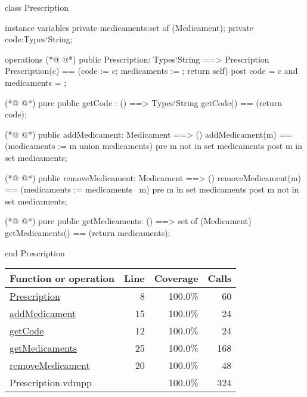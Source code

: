 \begin{vdmpp}[breaklines=true]
class Prescription

instance variables
  private medicaments:set of (Medicament);
  private code:Types`String;
  
operations
(*@
\label{Prescription:8}
@*)
 public Prescription: Types`String ==> Prescription
  Prescription(c) == (code := c; medicaments := {}; return self)
 post code = c and medicaments = {};
 
(*@
\label{getCode:12}
@*)
 pure public getCode : () ==> Types`String
  getCode() == (return code);
  
(*@
\label{addMedicament:15}
@*)
 public addMedicament: Medicament ==> ()
  addMedicament(m) == (medicaments := {m} union medicaments)
 pre m not in set medicaments
 post m in set medicaments;
  
(*@
\label{removeMedicament:20}
@*)
 public removeMedicament: Medicament ==> ()
  removeMedicament(m) == (medicaments := medicaments \ {m})
 pre m in set medicaments
 post m not in set medicaments;
  
(*@
\label{getMedicaments:25}
@*)
 pure public getMedicaments: () ==> set of (Medicament)
  getMedicaments() == (return medicaments);

end Prescription
\end{vdmpp}
\bigskip
\begin{longtable}{|l|r|r|r|}
\hline
Function or operation & Line & Coverage & Calls \\
\hline
\hline
\hyperref[Prescription:8]{Prescription} & 8&100.0\% & 60 \\
\hline
\hyperref[addMedicament:15]{addMedicament} & 15&100.0\% & 24 \\
\hline
\hyperref[getCode:12]{getCode} & 12&100.0\% & 24 \\
\hline
\hyperref[getMedicaments:25]{getMedicaments} & 25&100.0\% & 168 \\
\hline
\hyperref[removeMedicament:20]{removeMedicament} & 20&100.0\% & 48 \\
\hline
\hline
Prescription.vdmpp & & 100.0\% & 324 \\
\hline
\end{longtable}

